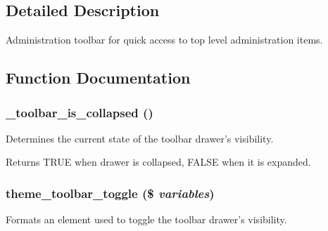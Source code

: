 \subsection{Detailed Description}
Administration toolbar for quick access to top level administration items. 

\subsection{Function Documentation}
\hypertarget{toolbar_8module_a4d55010e43540bac5da868dee270feaa}{
\subsubsection[{\_\-toolbar\_\-is\_\-collapsed}]{\setlength{\rightskip}{0pt plus 5cm}\_\-toolbar\_\-is\_\-collapsed ()}}
\label{toolbar_8module_a4d55010e43540bac5da868dee270feaa}
Determines the current state of the toolbar drawer's visibility.

\begin{DoxyReturn}{Returns}
TRUE when drawer is collapsed, FALSE when it is expanded. 
\end{DoxyReturn}
\hypertarget{toolbar_8module_a14011de2326542fa3b7a2af854a774e5}{
\subsubsection[{theme\_\-toolbar\_\-toggle}]{\setlength{\rightskip}{0pt plus 5cm}theme\_\-toolbar\_\-toggle (\$ {\em variables})}}
\label{toolbar_8module_a14011de2326542fa3b7a2af854a774e5}
Formats an element used to toggle the toolbar drawer's visibility.


